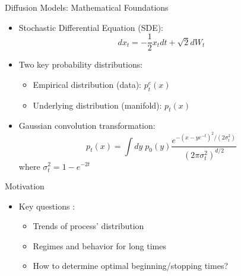 \documentclass[aspectratio=169]{beamer}
\begin{document}
\begin{frame}{Diffusion Models: Mathematical Foundations}
    \begin{itemize}
        \item Stochastic Differential Equation (SDE):
        \begin{equation}
            dx_t = -\frac{1}{2} x_t dt + \sqrt{2} dW_t
        \end{equation}
        
        \item Two key probability distributions:
        \begin{itemize}
            \item Empirical distribution (data): $p_t^e(x)$
            \item Underlying distribution (manifold): $p_t(x)$
        \end{itemize}
        
        \item Gaussian convolution transformation:
        \begin{equation}
            p_t(x) = \int dy \; p_0(y) \frac{e^{-(x-ye^{-t})^2/(2\sigma_t^2)}}{(2\pi\sigma_t^2)^{d/2}}
        \end{equation}
        where $\sigma_t^2 = 1-e^{-2t}$
    \end{itemize}
\end{frame}

\begin{frame}{Motivation}
    \begin{itemize}
        \item Key questions :
        \begin{itemize}
            \item Trends of process' distribution
            \item Regimes and behavior for long times
            \item How to determine optimal beginning/stopping times?
        \end{itemize}
    \end{itemize}
\end{frame}
\end{document}
